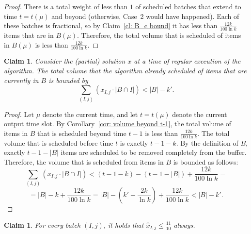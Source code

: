 \documentclass[12pt]{article}
\newtheorem{claim}[theorem]{Claim}
\begin{document}
\begin{proof}
There is a total weight of less than $1$ of scheduled batches 
that extend to time $t = t(\mu)$ and beyond (otherwise, 
Case~2 would have happened). Each of these batches is fractional,
so by Claim~\ref{cl: B_c bound} it has less than $\frac{12k}{100\ln k}$ 
items that are in $B(\mu)$. Therefore, the total volume
that is scheduled of items in $B(\mu)$ is less than
$\frac{12k}{100\ln k}$.
\end{proof}

\begin{claim}\label{cl: scheduled volume}
Consider the (partial) solution $x$ at a time of regular 
execution of  the algorithm.
The total volume that the algorithm already scheduled
of items that are currently in $B$ is bounded by
$$\sum_{(I,j)} \left(x_{I,j}\cdot |B\cap I|\right) < |B|-k'.$$
\end {claim}

\begin{proof}
Let $\mu$ denote the current time, and let $t=t(\mu)$ denote
the current output time slot. By Corollary~\ref{cor: volume beyond t-1},
the total volume of items in $B$ that is scheduled beyond time $t-1$
is less than $\frac{12k}{100\ln k}$. The total volume that is  
scheduled before time $t$ is exactly $t-1-k$. By the definition
of $B$, exactly $t-1-|B|$ items are scheduled to be removed completely 
from the buffer. Therefore, the volume that is scheduled from items in $B$
is bounded as follows:
$$
\sum_{(I,j)} \left(x_{I,j}\cdot |B\cap I|\right) < (t-1-k) - (t-1-|B|) + \frac{12k}{100\ln k} =
$$
$$
= |B|-k+\frac{12k}{100\ln k}= |B|-\left(k' +\frac{2k}{\ln k}\right)+\frac{12k}{100\ln k} 
< |B|-k'.
$$
\end{proof}

\begin{claim}\label{cl: x-hat bounded}
For every batch $(I,j)$, it holds that $\hat{x}_{I,j}\le \frac{11}{10}$
always.
\end{claim}
\end{document}
